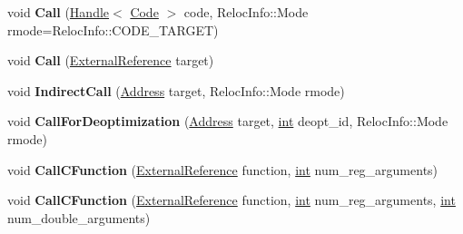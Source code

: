 \begin{DoxyCompactItemize}
\item 
\mbox{\label{classv8_1_1internal_1_1TurboAssembler_aed63ab5e2f5e491a0e49b9891d9242ee}} 
void {\bfseries Call} (\mbox{\hyperlink{classv8_1_1internal_1_1Handle}{Handle}}$<$ \mbox{\hyperlink{classv8_1_1internal_1_1Code}{Code}} $>$ code, Reloc\+Info\+::\+Mode rmode=Reloc\+Info\+::\+C\+O\+D\+E\+\_\+\+T\+A\+R\+G\+ET)
\item 
\mbox{\label{classv8_1_1internal_1_1TurboAssembler_aa58e64d9aa273d4f2dcb7fe36ec9025d}} 
void {\bfseries Call} (\mbox{\hyperlink{classv8_1_1internal_1_1ExternalReference}{External\+Reference}} target)
\item 
\mbox{\label{classv8_1_1internal_1_1TurboAssembler_ae7b4d6eee4fda0c5b8405c1a8b18f2d7}} 
void {\bfseries Indirect\+Call} (\mbox{\hyperlink{classuintptr__t}{Address}} target, Reloc\+Info\+::\+Mode rmode)
\item 
\mbox{\label{classv8_1_1internal_1_1TurboAssembler_a8fe9aeaba65f21a5f48bbf9ad66fa18d}} 
void {\bfseries Call\+For\+Deoptimization} (\mbox{\hyperlink{classuintptr__t}{Address}} target, \mbox{\hyperlink{classint}{int}} deopt\+\_\+id, Reloc\+Info\+::\+Mode rmode)
\item 
\mbox{\label{classv8_1_1internal_1_1TurboAssembler_a869e6f2160f183c5eb300d99265a79db}} 
void {\bfseries Call\+C\+Function} (\mbox{\hyperlink{classv8_1_1internal_1_1ExternalReference}{External\+Reference}} function, \mbox{\hyperlink{classint}{int}} num\+\_\+reg\+\_\+arguments)
\item 
\mbox{\label{classv8_1_1internal_1_1TurboAssembler_abdafca48f4971e28009f86e4ff25de15}} 
void {\bfseries Call\+C\+Function} (\mbox{\hyperlink{classv8_1_1internal_1_1ExternalReference}{External\+Reference}} function, \mbox{\hyperlink{classint}{int}} num\+\_\+reg\+\_\+arguments, \mbox{\hyperlink{classint}{int}} num\+\_\+double\+\_\+arguments)
\item 
\mbox{\label{classv8_1_1internal_1_1TurboAssembler_ac47afd32db8e770d2803e3f116c30e60}} 

\end{DoxyCompactItemize}
